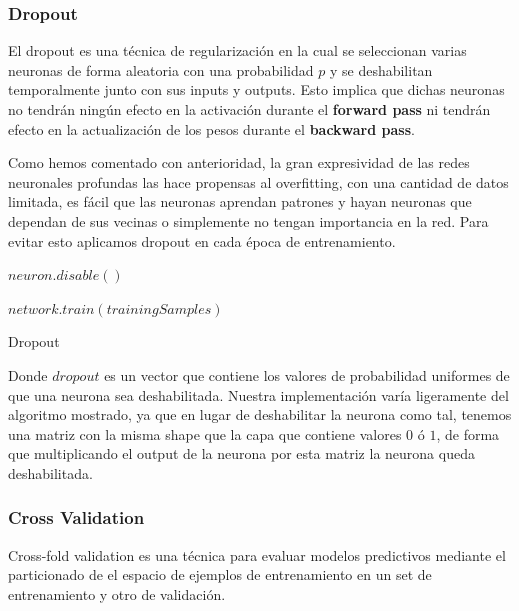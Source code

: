 \newpage
\subsubsection{Dropout}
\label{subsubsec:nn:backprop:dropout}

El dropout es una técnica de regularización en la cual se seleccionan varias neuronas de forma aleatoria con una probabilidad $p$ y se deshabilitan temporalmente junto con sus inputs y outputs. Esto implica que dichas neuronas no tendrán ningún efecto en la activación durante el \textbf{forward pass} ni tendrán efecto en la actualización de los pesos durante el \textbf{backward pass}.

Como hemos comentado con anterioridad, la gran expresividad de las redes neuronales profundas las hace propensas al overfitting, con una cantidad de datos limitada, es fácil que las neuronas aprendan patrones y hayan neuronas que dependan de sus vecinas o simplemente no tengan importancia en la red. Para evitar esto aplicamos dropout en cada época de entrenamiento.

\begin{algorithm}
    {
        {
            {
                 {
                    $neuron.disable()$
                 }
            }    
        }
        
        $network.train(trainingSamples)$
    }    
	\caption{Dropout}
	\label{alg:dropout}
\end{algorithm}

Donde $dropout$ es un vector que contiene los valores de probabilidad uniformes de que una neurona sea deshabilitada. Nuestra implementación varía ligeramente del algoritmo mostrado, ya que en lugar de deshabilitar la neurona como tal, tenemos una matriz con la misma shape que la capa que contiene valores $0$ ó $1$, de forma que multiplicando el output de la neurona por esta matriz la neurona queda deshabilitada.

\newpage
\subsubsection{Cross Validation}
\label{subsubsec:nn:backprop:crossVal}

Cross-fold validation es una técnica para evaluar modelos predictivos mediante el particionado de el espacio de ejemplos de entrenamiento en un set de entrenamiento y otro de validación.

